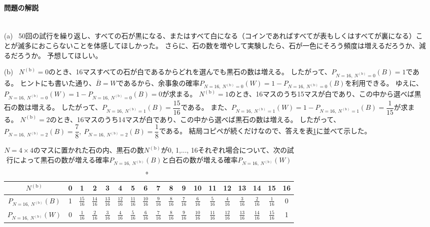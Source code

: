 \documentclass[luatexja,fontsize=12pt]{jlreq}\usepackage{ifthen}\newcounter{enlarge}\setcounter{enlarge}{1}
\begin{document}
\paragraph{問題の解説}
\mbox{}\\
\indent
(a)~
50回の試行を繰り返し、すべての石が黒になる、またはすべて白になる（コインであればすべてが表もしくはすべてが裏になる）ことが滅多におこらないことを体感してほしかった。
さらに、石の数を増やして実験したら、石が一色にそろう頻度は増えるだろうか、減るだろうか。
予想してほしい。

(b)~
$N^\mathrm{(b)} = 0$のとき、16マスすべての石が白であるからどれを選んでも黒石の数は増える。
したがって、$P_{N = 16,~N^\mathrm{(b)} = 0} (B) = 1$である。
ヒントにも書いた通り、$\overline{B} = W$であるから、余事象の確率$P_{N = 16,~N^\mathrm{(b)} = 0} (W) = 1 - P_{N = 16,~N^\mathrm{(b)} = 0} (B)$を利用できる。
ゆえに、$P_{N = 16,~N^\mathrm{(b)} = 0} (W) = 1 - P_{N = 16,~N^\mathrm{(b)} = 0} (B) = 0$が求まる。
$N^\mathrm{(b)} = 1$のとき、16マスのうち15マスが白であり、この中から選べば黒石の数は増える。
したがって、$P_{N = 16,~N^\mathrm{(b)} = 1} (B) = \dfrac{15}{16}$である。
また、$P_{N = 16,~N^\mathrm{(b)} = 1} (W) = 1 - P_{N = 16,~N^\mathrm{(b)} = 1} (B) = \dfrac{1}{15}$が求まる。
$N^\mathrm{(b)} = 2$のとき、16マスのうち14マスが白であり、この中から選べば黒石の数は増える。
したがって、$P_{N = 16,~N^\mathrm{(b)} = 2} (B) = \dfrac{7}{8} ,~ P_{N = 16,~N^\mathrm{(b)} = 2} (B) = \dfrac{1}{8}$である。
結局コピペが続くだけなので、答えを表\ref{t:1}に並べて示した。
\begin{table}[]
\caption{$N = 4 \times 4$のマスに置かれた石の内、黒石の数$N^\mathrm{(b)}$が0, 1,..., 16それぞれ場合について、次の試行によって黒石の数が増える確率$P_{N = 16,~N^\mathrm{(b)}} (B)$と白石の数が増える確率$P_{N = 16,~N^\mathrm{(b)}} (W)$。}
\label{t:1}
\centering
\begin{tabular}{cccccccccccccccccc} \hline
$N^\mathrm{(b)}$ & 0 & 1 & 2 & 3 & 4 & 5 & 6 & 7 & 8 & 9 & 10 & 11 & 12 & 13 & 14 & 15 & 16 \\ \hline 
$P_{N = 16,~N^\mathrm{(b)}} (B)$ & 1 & $\frac{15}{16}$ & $\frac{14}{16}$ & $\frac{13}{16}$ & $\frac{12}{16}$ & $\frac{11}{16}$ & $\frac{10}{16}$ & $\frac{9}{16}$ & $\frac{8}{16}$ & $\frac{7}{16}$ & $\frac{6}{16}$ & $\frac{5}{16}$ & $\frac{4}{16}$ & $\frac{3}{16}$ & $\frac{2}{16}$ & $\frac{1}{16}$ & 0 \\
$P_{N = 16,~N^\mathrm{(b)}} (W)$ & 0 & $\frac{1}{16}$ & $\frac{2}{16}$ & $\frac{3}{16}$ & $\frac{4}{16}$ & $\frac{5}{16}$ & $\frac{6}{16}$ & $\frac{7}{16}$ & $\frac{8}{16}$ & $\frac{9}{16}$ & $\frac{10}{16}$ & $\frac{11}{16}$ & $\frac{12}{16}$ & $\frac{13}{16}$ & $\frac{14}{16}$ & $\frac{15}{16}$ & 1 \\ \hline 
\end{tabular}    
\end{table}
\end{document}
